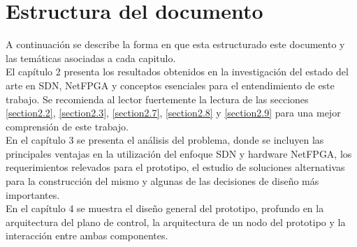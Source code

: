                    


\section{Estructura del documento}

A continuación se describe la forma en que esta estructurado este documento y las temáticas asociadas a cada capitulo.\\

El cap\'itulo 2 presenta los resultados obtenidos en la investigación del estado del arte en SDN, NetFPGA y conceptos esenciales para el entendimiento de este trabajo. Se recomienda al lector fuertemente la lectura de las secciones \ref{section2.2}, \ref{section2.3}, \ref{section2.7}, \ref{section2.8} y \ref{section2.9} para una mejor comprensión de este trabajo.\\

En el cap\'itulo 3 se presenta el análisis del problema, donde se incluyen las principales ventajas en la utilización del enfoque SDN y hardware NetFPGA, los requerimientos relevados para el prototipo, el estudio de soluciones alternativas para la construcción del mismo y algunas de las decisiones de diseño m\'as importantes.\\

En el cap\'itulo 4 se muestra el diseño general del prototipo, profundo en la arquitectura del plano de control, la arquitectura de un nodo del prototipo y la interacción entre ambas componentes.\\

